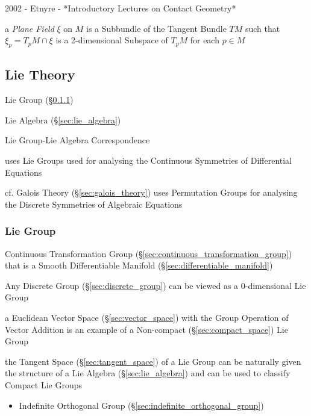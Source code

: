 2002 - Etnyre - *Introductory Lectures on Contact Geometry*

a \emph{Plane Field} $\xi$ on $M$ is a Subbundle of the Tangent Bundle $TM$
such that $\xi_p = T_p M \cap \xi$ is a 2-dimensional Subspace of $T_pM$ for
each $p \in M$



\subsection{Lie Theory}\label{sec:lie_theory}

Lie Group (\S\ref{sec:lie_group})

Lie Algebra (\S\ref{sec:lie_algebra})

Lie Group-Lie Algebra Correspondence

uses Lie Groups used for analysing the Continuous Symmetries of
Differential Equations %

cf. Galois Theory (\S\ref{sec:galois_theory}) uses Permutation Groups
for analysing the Discrete Symmetries of Algebraic Equations %



\subsubsection{Lie Group}\label{sec:lie_group}\hfill

Continuous Transformation Group
(\S\ref{sec:continuous_transformation_group}) that is a Smooth
Differentiable Manifold (\S\ref{sec:differentiable_manifold})

Any Discrete Group (\S\ref{sec:discrete_group}) can be viewed as a
$0$-dimensional Lie Group %

a Euclidean Vector Space (\S\ref{sec:vector_space}) with the Group Operation of
Vector Addition is an example of a Non-compact (\S\ref{sec:compact_space}) Lie
Group

the Tangent Space (\S\ref{sec:tangent_space}) of a Lie Group can be naturally
given the structure of a Lie Algebra (\S\ref{sec:lie_algebra}) and can be used
to classify Compact Lie Groups

\begin{itemize}
  \item Indefinite Orthogonal Group (\S\ref{sec:indefinite_orthogonal_group})
\end{itemize}



